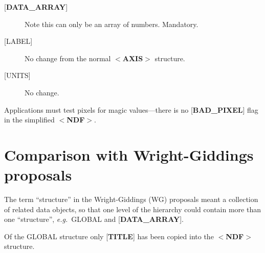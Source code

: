 \documentclass[twoside,11pt,nolof,noabs]{starlink}
\begin{document}
\begin{description}
\item [{[}\textbf{DATA\_ARRAY}{]}]  Note this can only be an array of numbers.
Mandatory.
\item [{[}LABEL{]}]  No change from the normal $<$\textbf{AXIS}$>$ structure.
\item [{[}UNITS{]}]  No change.
\end{description}
Applications must test pixels for magic values---there is no
{[}\textbf{BAD\_PIXEL}{]} flag in the simplified $<$\textbf{NDF}$>$.

\section{Comparison with Wright-Giddings proposals\label{se:comparison}}

The term ``structure'' in the Wright-Giddings (WG) proposals meant
a collection of related data objects, so that one level of the hierarchy
could contain more than one ``structure'', \textit{e.g.}\  GLOBAL and
{[}\textbf{DATA\_ARRAY}{]}.

Of the GLOBAL structure only {[}\textbf{TITLE}{]} has been copied into the
$<$\textbf{NDF}$>$ structure.
\end{document}
